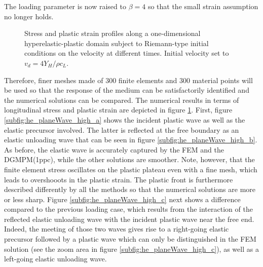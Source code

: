 The loading parameter is now raised to $\beta=4$ so that the small strain assumption no longer holds.
\begin{figure}[h!]
  \centering
  {}
  {}
  {}
  {}
  {}
  {}
  {}
  {}
  {}
  
  
  
  \caption{Stress and plastic strain profiles along a one-dimensional hyperelastic-plastic domain subject to Riemann-type initial conditions on the velocity at different times. Initial velocity set to $v_d=4Y_H/\rho c_L$.
  }
  \label{fig:hep_planeWave_high}
\end{figure}
Therefore, finer meshes made of $300$ finite elements and $300$ material points will be used so that the response of the medium can be satisfactorily identified and the numerical solutions can be compared.
The numerical results in terms of longitudinal stress and plastic strain are depicted in figure \ref{fig:hep_planeWave_high}.
First, figure \ref{subfig:he_planeWave_high_a} shows the incident plastic wave as well as the elastic precursor involved.
The latter is reflected at the free boundary as an elastic unloading wave that can be seen in figure \ref{subfig:he_planeWave_high_b}.
As before, the elastic wave is accurately captured by the FEM and the DGMPM(1ppc), while the  other solutions are smoother.
Note, however, that the finite element stress oscillates on the plastic plateau even with a fine mesh, which leads to overshooots in the plastic strain.
The plastic front is furthermore described differently by all the methods so that the numerical solutions are more or less sharp. 
%
Figure \ref{subfig:he_planeWave_high_c} next shows a difference compared to the previous loading case, which results from the interaction of the reflected elastic unloading wave with the incident plastic wave near the free end.
Indeed, the meeting of those two waves gives rise to a right-going elastic precursor followed by a plastic wave which can only be distinguished in the FEM solution (see the zoom area in figure \ref{subfig:he_planeWave_high_c}), as well as a left-going elastic unloading wave.
